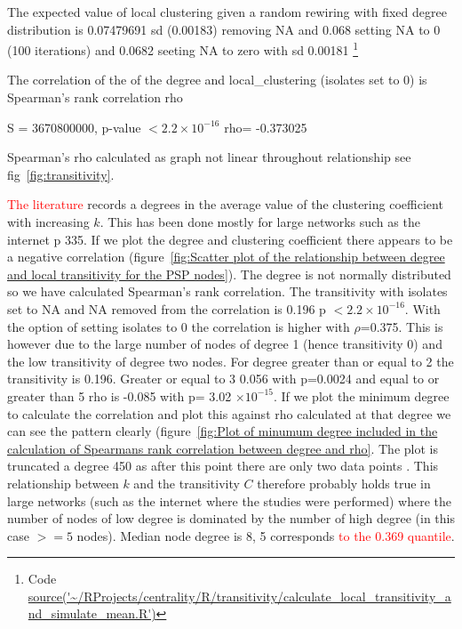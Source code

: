 The expected value of local clustering given a random rewiring with fixed degree distribution is 0.07479691 sd (0.00183) removing NA and 0.068 setting NA to 0 (100 iterations) and 0.0682 seeting NA to zero with sd 0.00181 \footnote{Code  \url{source('~/RProjects/centrality/R/transitivity/calculate_local_transitivity_and_simulate_mean.R')} }



The correlation of the of the degree and local\_clustering (isolates set to 0)  is 
	Spearman's rank correlation rho

S = 3670800000, p-value $< 2.2 \times 10^{-16}$
      rho= 
-0.373025 

Spearman's rho calculated as graph not linear throughout relationship see fig~\ref{fig:transitivity}.

\textcolor{red}{The literature} records a degrees in the average value of the clustering coefficient with increasing $k$. This has been done mostly for large networks such as the internet \cite{newman2018networks} p 335. If we plot the degree and clustering coefficient there appears to be a negative correlation (figure~\ref{fig:Scatter plot of the relationship between degree and local transitivity for the PSP nodes}). The degree is not normally distributed so we have calculated Spearman's rank correlation. The transitivity with isolates set to NA and NA removed from the correlation is 0.196 p $< 2.2 \times 10^{-16}$. With the option of setting isolates to 0 the correlation is higher with $\rho$=0.375. This is however due to the large number of nodes of degree 1 (hence transitivity 0) and the low transitivity of degree two nodes. For degree greater than or equal to 2 the transitivity is 0.196. Greater or equal to 3 0.056 with p=0.0024 and equal to or greater than 5 rho is -0.085 with p= 3.02 $\times 10^{-15}$. If we plot the minimum degree to calculate the correlation and plot
this against rho calculated at that degree we can see the pattern clearly (figure~\ref{fig:Plot of minumum degree included in the calculation of Spearmans rank correlation between degree and rho}. The plot is truncated a degree 450 as after this point there are only two data points .
This relationship between $k$ and the transitivity $C$ therefore probably holds true in large networks (such as the internet where the studies were performed) where the number of nodes of low degree is dominated by the number of high degree (in this case $>=5$ nodes). Median node degree is 8, 5 corresponds \textcolor{red}{ to the 0.369 quantile}.

